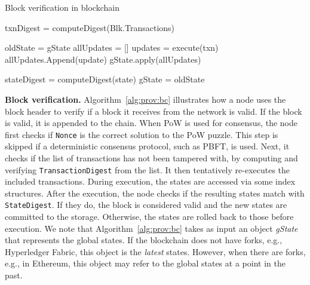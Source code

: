\begin{algorithm}
    \caption{Block verification in blockchain}
    \label{alg:prov:bc}
  
     {
      \;
    }
  
    txnDigest = computeDigest(Blk.Transactions)\;
     {
      \;
    }
  
    oldState = gState\;
    allUpdates = []\;
     {
      updates = execute(txn)\;
      allUpdates.Append(update)\;
    }
    gState.apply(allUpdates)\;
  
    stateDigest = computeDigest(state)\;
     {
      gState = oldState\;
      \;
    } 
  \end{algorithm}

\textbf{Block verification.} Algorithm~\ref{alg:prov:bc} illustrates how a node uses the block header to verify
if a block it receives from the network is valid. If the block is valid, it is appended to the chain. When PoW
is used for consensus, the node first checks if \texttt{Nonce} is the correct solution to the PoW puzzle. This
step is skipped if a deterministic consensus protocol, such as PBFT, is used. Next, it checks if the list of
transactions has not been tampered with, by computing and verifying \texttt{TransactionDigest} from the list. It then tentatively re-executes the included transactions. During execution, the states are
accessed via some index structures.  After the execution, the node checks if the resulting states match with
\texttt{StateDigest}. If they do, the block is considered valid and the new states are committed to the
storage.  Otherwise, the states are rolled back to those before execution. We note that
Algorithm~\ref{alg:prov:bc} takes as input an object {\em gState} that represents the global states.  If the
blockchain does not have forks, e.g., Hyperledger Fabric, this object is the {\em latest} states. However, when
there are forks, e.g., in Ethereum, this object may refer to the global states at a point in the past.


